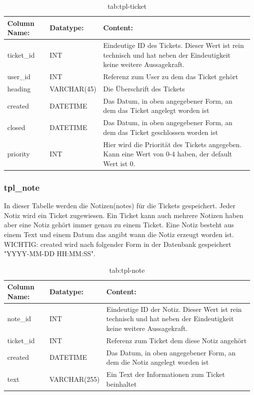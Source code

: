 \begin{table}[h]
	\begin{tabular}{|p{3.5cm}|p{4cm}|p{6.2cm}|}
		\hline
		\textbf{Column Name:} & \textbf{Datatype:} & \textbf{Content:}\\
		\hline
		ticket\_id & INT & Eindeutige ID des Tickets. Dieser Wert ist rein technisch und hat neben der Eindeutigkeit keine weitere Aussagekraft.\\
		\hline
		user\_id & INT & Referenz zum User zu dem das Ticket gehört\\
		\hline
		heading & VARCHAR(45) &  Die Überschrift des Tickets\\
		\hline
		created & DATETIME & Das Datum, in oben angegebener Form, an dem das Ticket angelegt worden ist\\
		\hline
		closed & DATETIME & Das Datum, in oben angegebener Form, an dem das Ticket geschlossen worden ist\\
		\hline
		priority & INT & Hier wird die Priorität des Tickets angegeben. Kann eine Wert von 0-4 haben, der default Wert ist 0.\\
		\hline
	\end{tabular}
	\caption{tab:tpl-ticket}
\end{table}
\label{tab:tpl_ticket}

\newpage

\subsubsection{tpl\_note}

In dieser Tabelle werden die Notizen(notes) für die Tickets gespeichert. Jeder Notiz wird ein Ticket zugewiesen. Ein Ticket kann auch mehrere Notizen haben aber eine Notiz gehört immer genau zu einem Ticket. Eine Notiz besteht aus einem Text und einem Datum das angibt wann die Notiz erzeugt worden ist.
WICHTIG: created wird nach folgender Form in der Datenbank gespeichert "YYYY-MM-DD HH:MM:SS".

\begin{table}[h]
	\begin{tabular}{|p{3.5cm}|p{4cm}|p{6.2cm}|}
		\hline
		\textbf{Column Name:} & \textbf{Datatype:} & \textbf{Content:}\\
		\hline
		note\_id & INT & Eindeutige ID der Notiz. Dieser Wert ist rein technisch und hat neben der Eindeutigkeit keine weitere Aussagekraft.\\
		\hline
		ticket\_id & INT & Referenz zum Ticket dem diese Notiz angehört\\
		\hline
		created & DATETIME & Das Datum, in oben angegebener Form, an dem die Notiz angelegt worden ist\\
		\hline
		text & VARCHAR(255) & Ein Text der Informationen zum Ticket beinhaltet\\
		\hline
	\end{tabular}
	\caption{tab:tpl-note}
\end{table}
\label{tab:tpl_note}

